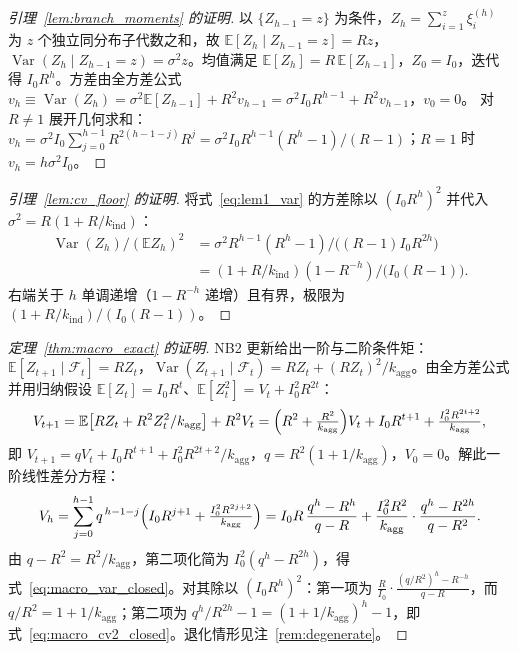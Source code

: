 \documentclass[10pt,UTF8,a4paper,zihao=-4]{ctexart}
\theoremstyle{plain}
\theoremstyle{remark}
\begin{document}
\begin{proof}[引理~\ref{lem:branch_moments} 的证明]
以 $\{Z_{h-1}=z\}$ 为条件，$Z_h = \sum_{i=1}^{z}\xi_i^{(h)}$ 为 $z$ 个独立同分布子代数之和，故 $\mathbb{E}[Z_h \mid Z_{h-1}=z] = Rz$，$\operatorname{Var}(Z_h \mid Z_{h-1}=z) = \sigma^2 z$。均值满足 $\mathbb{E}[Z_h] = R\,\mathbb{E}[Z_{h-1}]$，$Z_0=I_0$，迭代得 $I_0 R^h$。方差由全方差公式
$v_h \equiv \operatorname{Var}(Z_h) = \sigma^2 \mathbb{E}[Z_{h-1}] + R^2 v_{h-1} = \sigma^2 I_0 R^{h-1} + R^2 v_{h-1}$，$v_0 = 0$。
对 $R \ne 1$ 展开几何求和：$v_h = \sigma^2 I_0 \sum_{j=0}^{h-1} R^{2(h-1-j)} R^{j} = \sigma^2 I_0 R^{h-1} (R^h - 1)/(R-1)$；$R=1$ 时 $v_h = h \sigma^2 I_0$。
\end{proof}

\begin{proof}[引理~\ref{lem:cv_floor} 的证明]
将式~\eqref{eq:lem1_var} 的方差除以 $(I_0 R^h)^2$ 并代入 $\sigma^2 = R(1+R/k_{\text{ind}})$：
\begin{align*}
\operatorname{Var}(Z_h)/(\mathbb{E}Z_h)^2 &= \sigma^2 R^{h-1}(R^h-1)\big/\bigl((R-1)I_0 R^{2h}\bigr) \\
&= (1+R/k_{\text{ind}})(1-R^{-h})\big/\bigl(I_0(R-1)\bigr).
\end{align*}
右端关于 $h$ 单调递增（$1 - R^{-h}$ 递增）且有界，极限为 $(1+R/k_{\text{ind}})/(I_0(R-1))$。
\end{proof}

\begin{proof}[定理~\ref{thm:macro_exact} 的证明]
NB2 更新给出一阶与二阶条件矩：$\mathbb{E}[Z_{t+1}\mid\mathcal{F}_t] = R Z_t$，$\operatorname{Var}(Z_{t+1}\mid\mathcal{F}_t) = R Z_t + (R Z_t)^2/k_{\text{agg}}$。由全方差公式并用归纳假设 $\mathbb{E}[Z_t] = I_0 R^t$、$\mathbb{E}[Z_t^2] = V_t + I_0^2 R^{2t}$：
\[
V_{t+1} = \mathbb{E}\bigl[R Z_t + R^2 Z_t^2/k_{\text{agg}}\bigr] + R^2 V_t
= \Bigl(R^2 + \tfrac{R^2}{k_{\text{agg}}}\Bigr) V_t + I_0 R^{t+1} + \tfrac{I_0^2 R^{2t+2}}{k_{\text{agg}}},
\]
即 $V_{t+1} = q V_t + I_0 R^{t+1} + I_0^2 R^{2t+2}/k_{\text{agg}}$，$q = R^2(1+1/k_{\text{agg}})$，$V_0=0$。解此一阶线性差分方程：
\[
V_h = \sum_{j=0}^{h-1} q^{\,h-1-j}\Bigl(I_0 R^{j+1} + \tfrac{I_0^2 R^{2j+2}}{k_{\text{agg}}}\Bigr)
= I_0 R\,\frac{q^h - R^h}{q - R} + \frac{I_0^2 R^2}{k_{\text{agg}}}\cdot\frac{q^h - R^{2h}}{q - R^2}.
\]
由 $q - R^2 = R^2/k_{\text{agg}}$，第二项化简为 $I_0^2 (q^h - R^{2h})$，得式~\eqref{eq:macro_var_closed}。对其除以 $(I_0 R^h)^2$：第一项为 $\frac{R}{I_0}\cdot\frac{(q/R^2)^h - R^{-h}}{q-R}$，而 $q/R^2 = 1+1/k_{\text{agg}}$；第二项为 $q^h/R^{2h} - 1 = (1+1/k_{\text{agg}})^h - 1$，即式~\eqref{eq:macro_cv2_closed}。退化情形见注~\ref{rem:degenerate}。
\end{proof}
\end{document}
